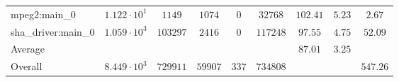\begin{tabular}{|l|c|c|c|c|c|c|c|c|}
mpeg2:main\_0           & $ 1.122 \cdot 10^{1} $ & $ 1149   $ & $ 1074  $ & $ 0   $ & $ 32768  $ & $ 102.41      $ & $ 5.23    $ & $ 2.67    $ \\
sha\_driver:main\_0     & $ 1.059 \cdot 10^{3} $ & $ 103297 $ & $ 2416  $ & $ 0   $ & $ 117248 $ & $ 97.55       $ & $ 4.75    $ & $ 52.09   $ \\
\hline
Average                 & $                    $ & $        $ & $       $ & $     $ & $        $ & $ 87.01       $ & $ 3.25    $ & $         $ \\
\hline
Overall                 & $ 8.449 \cdot 10^{3} $ & $ 729911 $ & $ 59907 $ & $ 337 $ & $ 734808 $ & $             $ & $         $ & $ 547.26  $ \\
\hline
\end{tabular}
